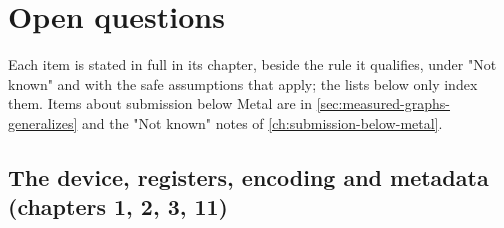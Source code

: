 \chapter{Open questions}\label{ch:not-known-index}

Each item is stated in full in its chapter, beside the rule it qualifies, under "Not known" and with the safe
assumptions that apply; the lists below only index them. Items about submission below Metal are in
\cref{sec:measured-graphs-generalizes} and the "Not known" notes of \cref{ch:submission-below-metal}.

\section{The device, registers, encoding and metadata (chapters 1, 2, 3, 11)}\label{sec:device-registers-encoding}

